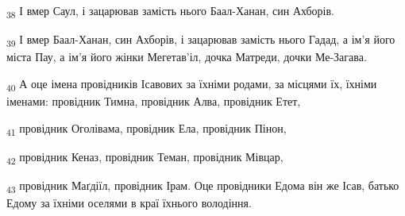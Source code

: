 \begin{tcolorbox}
\textsubscript{38} І вмер Саул, і зацарював замість нього Баал-Ханан, син Ахборів.
\end{tcolorbox}
\begin{tcolorbox}
\textsubscript{39} І вмер Баал-Ханан, син Ахборів, і зацарював замість нього Гадад, а ім'я його міста Пау, а ім'я його жінки Мегетав'іл, дочка Матреди, дочки Ме-Загава.
\end{tcolorbox}
\begin{tcolorbox}
\textsubscript{40} А оце імена провідників Ісавових за їхніми родами, за місцями їх, їхніми іменами: провідник Тимна, провідник Алва, провідник Етет,
\end{tcolorbox}
\begin{tcolorbox}
\textsubscript{41} провідник Оголівама, провідник Ела, провідник Пінон,
\end{tcolorbox}
\begin{tcolorbox}
\textsubscript{42} провідник Кеназ, провідник Теман, провідник Мівцар,
\end{tcolorbox}
\begin{tcolorbox}
\textsubscript{43} провідник Маґдіїл, провідник Ірам. Оце провідники Едома він же Ісав, батько Едому за їхніми оселями в краї їхнього володіння.
\end{tcolorbox}
